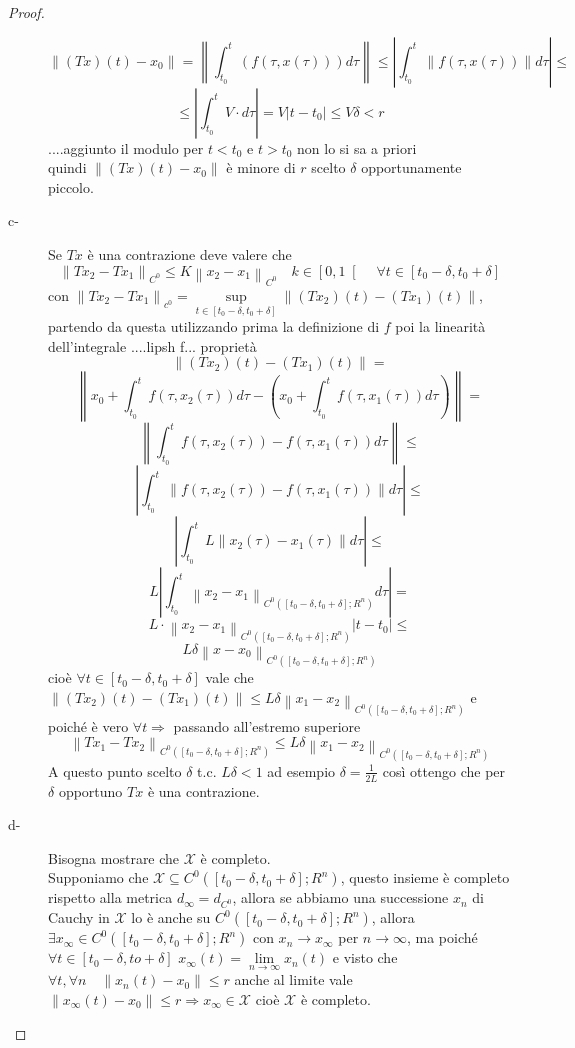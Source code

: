 \begin{proof}
\begin{description}
		$$\left\|(Tx)(t) - x_0 \right\| = \left\| \int_{t_0}^t(f(\tau,x(\tau)))d\tau \right\| \le \left|\int_{t_0}^t \left\| f(\tau,x(\tau)) \right\|d\tau \right|\le$$
		$$\le\left| \int_{t_0}^t V\cdot d\tau\right|=V\left| t-t_0\right|\le V\delta<r$$
		....aggiunto il modulo per $t<t_0$ e $t>t_0$ non lo si sa a priori\\
		quindi $\left\|(Tx)(t) - x_0 \right\|$ è minore di $r$ scelto $\delta$ opportunamente piccolo. 
		\item[c-] Se $Tx$ è una contrazione deve valere che
		$$\left\| Tx_2 - Tx_1\right\|_{C^0}\le K\left\|x_2-x_1\right\|_{C^0}\quad k\in\left[0,1\right[\quad\forall t\in\left[t_0-\delta,t_0+\delta\right]$$
		con $\left\|Tx_2-Tx_1\right\|_{c^0}=\sup\limits_{t\in\left[t_0-\delta,t_0+\delta\right]}\left\| (Tx_2)(t) - (Tx_1)(t)\right\|$, partendo da questa utilizzando prima la definizione di $f$ poi la linearità dell'integrale ....lipsh f... proprietà
		$$\left\| (Tx_2)(t) - (Tx_1)(t)\right\|=$$
		$$\left\| x_0+\int_{t_0}^t f(\tau,x_2(\tau)) d\tau - \left(x_0+\int_{t_0}^t f(\tau,x_1(\tau)) d\tau\right) \right\|=$$
		$$\left\| \int_{t_0}^t f(\tau,x_2(\tau))-f(\tau,x_1(\tau)) d\tau \right\|\le$$
		$$\left| \int_{t_0}^t \left\|f(\tau,x_2(\tau))-f(\tau,x_1(\tau))\right\| d\tau \right|\le$$
		$$\left| \int_{t_0}^t L\left\|x_2(\tau)-x_1(\tau)\right\| d\tau \right|\le$$
		$$L\left| \int_{t_0}^t \left\|x_2-x_1\right\|_{C^0(\left[t_0-\delta,t_0+\delta\right];R^n)} d\tau \right|=$$
		$$L\cdot \left\| x_2-x_1 \right\|_{C^0(\left[t_0-\delta,t_0+\delta\right];R^n)}\left|t-t_0\right|\le$$
		$$L\delta\left\|x-x_0\right\|_{C^0(\left[t_0-\delta,t_0+\delta\right];R^n)}$$
		cioè $\forall t \in \left[t_0-\delta,t_0+\delta\right]$ vale che $\left\|(Tx_2)(t)-(Tx_1)(t)\right\|\le L\delta\left\|x_1-x_2\right\|_{C^0(\left[t_0-\delta,t_0+\delta\right];R^n)}$ e poiché è vero $\forall t \Rightarrow $ passando all'estremo superiore
		$$ \left\| Tx_1 - Tx_2 \right\|_{C^0(\left[t_0-\delta,t_0+\delta\right];R^n)}\le L\delta\left\|x_1-x_2\right\|_{C^0(\left[t_0-\delta,t_0+\delta\right];R^n)}$$
		A questo punto scelto $\delta$ t.c. $L\delta<1$ ad esempio $\delta=\frac{1}{2L}$ così ottengo che per $\delta$ opportuno $Tx$ è una contrazione.		
		\item[d-] Bisogna mostrare che $\mathcal{X}$ è completo.\\
		Supponiamo che $\mathcal{X}\subseteq C^0(\left[t_0-\delta,t_0+\delta\right];R^n)$, questo insieme è completo rispetto alla metrica $d_\infty=d_{C^0}$, allora se abbiamo una successione $x_n$ di Cauchy in $\mathcal{X}$ lo è anche su $C^0(\left[t_0-\delta,t_0+\delta\right];R^n)$, allora $\exists x_\infty\in C^0(\left[t_0-\delta,t_0+\delta\right];R^n)$ con $x_n\to x_\infty$ per $n\to\infty$, ma poiché $\forall t \in\left[t_0-\delta,to+\delta\right]$ $x_\infty(t)=\lim\limits_{n\to\infty}x_n(t)$ e visto che $\forall t,\forall n\quad \left\| x_n(t)-x_0\right\|\le r$ anche al limite vale $\left\| x_{\infty}(t)-x_0\right\|\le r \Rightarrow x_\infty\in\mathcal{X}$ cioè $\mathcal{X}$ è completo.

\end{description}
\end{proof}
